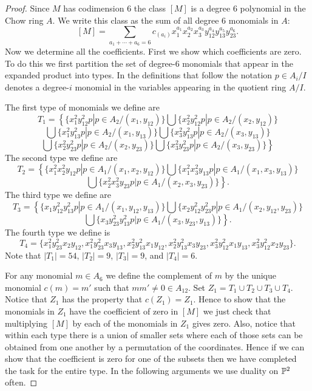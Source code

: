\documentclass[12pt]{article}
\theoremstyle{plain}
\theoremstyle{definition}
\renewcommand{\P}{\ensuremath \mathbb{P}}
\begin{document}
\begin{proof} Since $M$ has codimension 6 the class $[M]$ is a degree 6 polynomial in the Chow ring $A$. We write this class as the sum of all degree 6 monomials in $A$: $$[M]=\sum\limits_{a_1+\cdots +a_6=6}c_{(a_i)}x_1^{a_1}x_2^{a_2}x_3^{a_3}y_{12}^{a_4}y_{13}^{a_5}y_{23}^{a_6} .$$ Now we determine all the coefficients. First we show which coefficients are zero. To do this we first partition the set of degree-6 monomials that appear in the expanded product into types. In the definitions that follow the notation $p \in A_i/I$ denotes a degree-$i$ monomial in the variables appearing in the quotient ring $A/I$.  

The first type of monomials we define are  $$T_1=\left\{ \{ x_1^2y_{12}^2p| p\in A_2/(x_1,y_{12})\} \bigcup \{ x_2^2y_{12}^2p| p\in A_2/(x_2,y_{12})\} \right.$$ $$ \bigcup \{ x_1^2y_{13}^2p| p\in A_2/(x_1,y_{13})\} \bigcup \{ x_3^2y_{13}^2p| p\in A_2/(x_3,y_{13})\} $$ $$\left. \bigcup \{ x_2^2y_{23}^2p| p\in A_2/(x_2,y_{23})\} 
\bigcup \{ x_3^2y_{23}^2p| p\in A_2/(x_3,y_{23})\}
\right\}$$ The second type we define are $$T_2=\left\{ \{x_1^2x_2^2y_{12}p|p\in A_1/(x_1,x_2,y_{12})\} \bigcup \{x_1^2x_3^2y_{13}p|p\in A_1/(x_1,x_3,y_{13})\} \right. $$ $$ \left. \bigcup \{x_2^2x_3^2y_{23}p|p\in A_1/(x_2,x_3,y_{23})\} \right\} .$$ The third type we define are $$T_3=\left\{ \{x_1y_{12}^2y_{13}^2p|p\in A_1/(x_1,y_{12},y_{13})\} \bigcup \{x_2y_{12}^2y_{23}^2p|p\in A_1/(x_2,y_{12},y_{23})\} \right. $$ $$ \left. \bigcup \{x_3y_{23}^2y_{13}^2p|p\in A_1/(x_3,y_{23},y_{13})\} \right\} .$$ The fourth type we define is $$T_4=\{ x_1^2y_{23}^2x_2y_{12},x_1^2y_{23}^2x_3y_{13},x_2^2y_{13}^2x_1y_{12},x_2^2y_{13}^2x_3y_{23},x_3^2y_{12}^2x_1y_{13},x_3^2y_{12}^2x_2y_{23}\} .$$ Note that $|T_1|=54$, $|T_2|=9$, $|T_3|=9$, and $|T_4|=6$.

For any monomial $m\in A_6$ we define the complement of $m$ by the unique monomial  $c(m)=m'$ such that $mm'\neq 0 \in A_{12}$. Set $Z_1=T_1\cup T_2\cup T_3\cup T_4$. Notice that $Z_1$ has the property that $c(Z_1)=Z_1$. Hence to show that the monomials in $Z_1$ have the coefficient of zero in $[M]$ we just check that multiplying $[M]$ by each of the monomials in $Z_1$ gives zero. Also, notice that within each type there is a union of smaller sets where each of those sets can be obtained from one another by a permutation of the coordinates. Hence if we can show that the coefficient is zero for one of the subsets then we have completed the task for the entire type. In the following arguments we use duality on $\P^2$ often. 


\end{proof}
\end{document}
